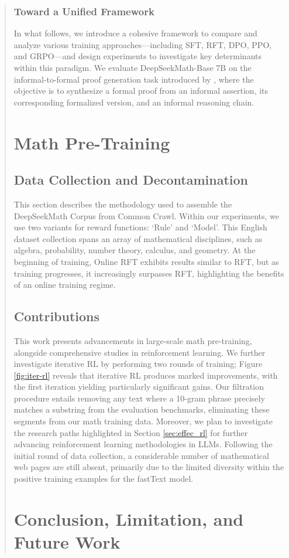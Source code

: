 \begin{abstract}
\begin{itemize}[topsep=0pt]
\begin{itemize}[topsep=0pt]
\begin{itemize}[topsep=0pt]
\subsubsection{Toward a Unified Framework} In what follows, we introduce a cohesive framework to compare and analyze various training approaches—including SFT, RFT, DPO, PPO, and GRPO—and design experiments to investigate key determinants within this paradigm. We evaluate DeepSeekMath-Base 7B on the informal-to-formal proof generation task introduced by \citep{dsp_proof}, where the objective is to synthesize a formal proof from an informal assertion, its corresponding formalized version, and an informal reasoning chain. \section{Math Pre-Training}

\subsection{Data Collection and Decontamination} This section describes the methodology used to assemble the DeepSeekMath Corpus from Common Crawl. Within our experiments, we use two variants for reward functions: `Rule' and `Model'. This English dataset collection spans an array of mathematical disciplines, such as algebra, probability, number theory, calculus, and geometry. At the beginning of training, Online RFT exhibits results similar to RFT, but as training progresses, it increasingly surpasses RFT, highlighting the benefits of an online training regime. \subsection{Contributions}
This work presents advancements in large-scale math pre-training, alongside comprehensive studies in reinforcement learning. We further investigate iterative RL by performing two rounds of training; Figure \ref{fig:iter-rl} reveals that iterative RL produces marked improvements, with the first iteration yielding particularly significant gains. Our filtration procedure entails removing any text where a 10-gram phrase precisely matches a substring from the evaluation benchmarks, eliminating these segments from our math training data. Moreover, we plan to investigate the research paths highlighted in Section \ref{sec:effec_rl} for further advancing reinforcement learning methodologies in LLMs. Following the initial round of data collection, a considerable number of mathematical web pages are still absent, primarily due to the limited diversity within the positive training examples for the fastText model. \section{Conclusion, Limitation, and Future Work} 


\end{itemize}
\end{itemize}
\end{itemize}
\end{abstract}

